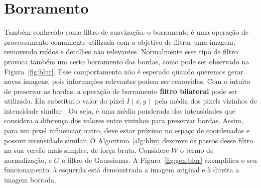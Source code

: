 
%

\section{Borramento}

Também conhecido como filtro de suavização, o borramento é uma operação de processamento comumente utilizada com o objetivo de filtrar uma imagem, removendo ruídos e detalhes não relevantes. Normalmente esse tipo de filtro provoca também um certo borramento das bordas, como pode ser observado na Figura~\ref{fig:blur}. Esse comportamento não é esperado quando queremos gerar novas imagens, pois informações relevantes podem ser removidas. Com o intuito de preservar as bordas, a operação de borramento \textbf{filtro bilateral} pode ser utilizada. Ela substitui o valor do pixel $I(x,y)$ pela média dos pixels vizinhos de intensidade similar \cite{Tomasi1998}. Ou seja, é uma média ponderada das intensidades que considera a diferença dos valores entre vizinhos para preservar bordas. Assim, para um pixel influenciar outro, deve estar próximo no espaço de coordenadas e possuir intensidade similar. O Algoritmo~\ref{alg:blur} descreve os passos desse filtro na sua versão mais simples, de força bruta. Considere $W$ o termo de normalização, e $G$ o filtro de Gaussianas. A Figura~\ref{fig:gen:blur} exemplifica o seu funcionamento: à esquerda está demonstrada a imagem original e à direita a imagem borrada.

